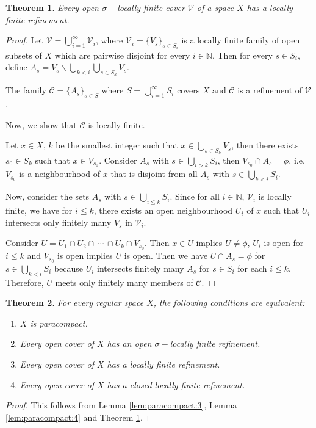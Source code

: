 \documentclass[12pt,oneside,english]{amsbook}
\numberwithin{equation}{section} %
\numberwithin{figure}{section} %
\theoremstyle{plain}
\numberwithin{section}{chapter}
\newtheorem{thm}{Theorem}[section]
\theoremstyle{plain}
\begin{document}
\begin{thm} \label{thm:paracompact:8}
  Every open $\sigma-$locally finite cover $\mathcal{V}$ of a space $X$ has a locally finite refinement.
\end{thm}
\begin{proof}
  Let $\mathcal{V} = \bigcup_{i = 1}^{\infty}\mathcal{V}_{i}$, where $\mathcal{V}_{i} = \{V_{s}\}_{s \in S_{i}}$ is a locally finite family of open subsets of $X$ which are pairwise disjoint for every $i \in \mathbb{N}$. Then for every $s \in S_{i}$, define $A_{s} = V_{s} \backslash \bigcup_{k < i} \bigcup_{s \in S_{k}} V_{s}$.

  The family $\mathcal{C} = \{A_{s}\}_{s \in S}$ where $S = \bigcup_{i = 1}^{\infty}S_{i}$ covers $X$ and $\mathcal{C}$ is a refinement of $\mathcal{V}$.

  Now, we show that $\mathcal{C}$ is locally finite.

  Let $x \in X$, $k$ be the smallest integer such that $x \in \bigcup_{s \in S_{k}} V_{s}$, then there exists $s_{0} \in S_{k}$ such that $x \in V_{s_{0}}$. Consider $A_{s}$ with $s \in \bigcup_{i > k}S_{i}$, then $V_{s_{0}} \cap A_{s} = \phi$, i.e. $V_{s_{0}}$ is a neighbourhood of $x$ that is disjoint from all $A_s$ with $s \in \bigcup_{k < i}S_{i}$.

  Now, consider the sets $A_{s}$ with $s \in \bigcup_{i \leq k}S_{i}$. Since for all $i \in \mathbb{N}$, $\mathcal{V}_{i}$ is locally finite, we have for $i \leq k$, there exists an open neighbourhood $U_{i}$ of $x$ such that $U_{i}$ intersects only finitely many $V_{s}$ in $\mathcal{V}_{i}$.

  Consider $U = U_{1} \cap U_{2} \cap \, \cdots \, \cap U_{k} \cap V_{s_{0}}$. Then $x \in U$ implies $U \neq \phi$, $U_{i}$ is open for $i \leq k$ and $V_{s_{0}}$ is open implies $U$ is open. Then we have $U \cap A_{s} = \phi$ for $s \in \bigcup_{k < i}S_{i}$ because $U_{i}$ intersects finitely many $A_{s}$ for $s \in S_{i}$ for each $i \leq k$. Therefore, $U$ meets only finitely many members of $\mathcal{C}$.
\end{proof}

\begin{thm} \label{thm:paracompact:9}
  For every regular space $X$, the following conditions are equivalent:
  \begin{enumerate}
  \item $X$ is paracompact.
  \item Every open cover of $X$ has an open $\sigma-$locally finite refinement.
  \item Every open cover of $X$ has a locally finite refinement.
  \item Every open cover of $X$ has a closed locally finite refinement.
  \end{enumerate}
\end{thm}
\begin{proof}
  This follows from Lemma \ref{lem:paracompact:3}, Lemma \ref{lem:paracompact:4} and Theorem \ref{thm:paracompact:8}.
\end{proof}
\end{document}
